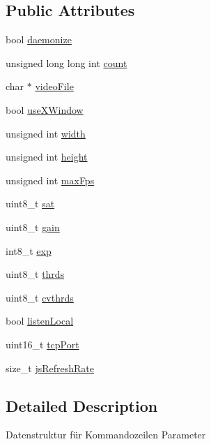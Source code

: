 \subsection*{Public Attributes}
\begin{DoxyCompactItemize}
\item 
bool \hyperlink{structcmd__opts_a0e94dcdbf5c755d97477c346ece96a2e}{daemonize}
\item 
unsigned long long int \hyperlink{structcmd__opts_a582f29b5e8c3328779e88bcb22ff3c2e}{count}
\item 
char $\ast$ \hyperlink{structcmd__opts_acee5a1c6793898bbda38d6d7fb5de431}{video\+File}
\item 
bool \hyperlink{structcmd__opts_aee44e8161de659e8fff50e09100f9ada}{use\+X\+Window}
\item 
unsigned int \hyperlink{structcmd__opts_a0f13b6290e7e33c22a258c11ed23f72f}{width}
\item 
unsigned int \hyperlink{structcmd__opts_a0ab9c9cf886559f8cf19dd2f7be072fb}{height}
\item 
unsigned int \hyperlink{structcmd__opts_a2b42f4e7bd954f5ac87c82e9d19a9b84}{max\+Fps}
\item 
uint8\+\_\+t \hyperlink{structcmd__opts_aa83f2910f6a1803ee8c9f9e3581db314}{sat}
\item 
uint8\+\_\+t \hyperlink{structcmd__opts_a55323cae5dfbafe672e6581da99985b9}{gain}
\item 
int8\+\_\+t \hyperlink{structcmd__opts_aa6ef1ebf0fbaa8bd7016a8ef1a2c5ef4}{exp}
\item 
uint8\+\_\+t \hyperlink{structcmd__opts_a7518cdbdbc6ed1b8cc404aa675f383a6}{thrds}
\item 
uint8\+\_\+t \hyperlink{structcmd__opts_a6d2fcb749257ff950fabdb000999d7f9}{cvthrds}
\item 
bool \hyperlink{structcmd__opts_a9d2405b56bef96f631ac27a4d3ff3cb4}{listen\+Local}
\item 
uint16\+\_\+t \hyperlink{structcmd__opts_a2f37e990a3592777d92c156548422150}{tcp\+Port}
\item 
size\+\_\+t \hyperlink{structcmd__opts_af3bc7afbf82fe94305a11352c584fb6e}{js\+Refresh\+Rate}
\end{DoxyCompactItemize}


\subsection{Detailed Description}
Datenstruktur für Kommandozeilen Parameter 

